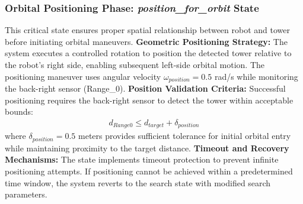 \subsubsection{Orbital Positioning Phase: \textit{position\_for\_orbit} State}
This critical state ensures proper spatial relationship between robot and tower before initiating orbital maneuvers.
\textbf{Geometric Positioning Strategy:}
The system executes a controlled rotation to position the detected tower relative to the robot's right side, enabling subsequent left-side orbital motion. The positioning maneuver uses angular velocity $\omega_{position} = 0.5$ rad/s while monitoring the back-right sensor (Range\_0).
\textbf{Position Validation Criteria:}
Successful positioning requires the back-right sensor to detect the tower within acceptable bounds:
\begin{align}
d_{Range0} \leq d_{target} + \delta_{position}
\end{align}
where $\delta_{position} = 0.5$ meters provides sufficient tolerance for initial orbital entry while maintaining proximity to the target distance.
\textbf{Timeout and Recovery Mechanisms:}
The state implements timeout protection to prevent infinite positioning attempts. If positioning cannot be achieved within a predetermined time window, the system reverts to the search state with modified search parameters.
